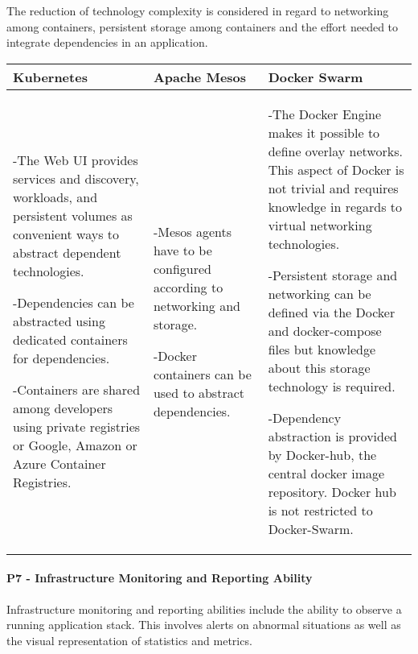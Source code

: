 The reduction of technology complexity is considered in regard to networking
among containers, persistent storage among containers and the effort needed to
integrate dependencies in an application.

\begin{center}
  \begin{tabular}{ | p{4.5cm} | p{4.5cm} | p{4.5cm} | }
    \hline
    \textbf{Kubernetes}&\textbf{Apache Mesos}&\textbf{Docker Swarm}\\\hline
    -The Web UI provides services and discovery, workloads, and persistent
    volumes as convenient ways to abstract dependent technologies.
    
    -Dependencies can be abstracted using dedicated containers for dependencies.
    
    -Containers are shared among developers using private registries
    or Google, Amazon or Azure Container Registries.&
    
    -Mesos agents have to be configured according to networking and storage.
    
    -Docker containers can be used to abstract dependencies. & 
    
    -The Docker Engine makes it possible to define overlay networks. This aspect
    of Docker is not trivial and requires knowledge in regards to virtual
    networking technologies.
    
    -Persistent storage and networking can be defined via the Docker and
    docker-compose files but knowledge about this storage technology is
    required.
    
    -Dependency abstraction is provided by Docker-hub, the central docker image
    repository. Docker hub is not restricted to Docker-Swarm.\\
    \hline
  \end{tabular}
\end{center}

\newpage
\paragraph{P7 - Infrastructure Monitoring and Reporting Ability}

Infrastructure monitoring and reporting abilities include the ability to observe
a running \ms{} application stack. This involves alerts on abnormal situations
as well as the visual representation of statistics and metrics.

